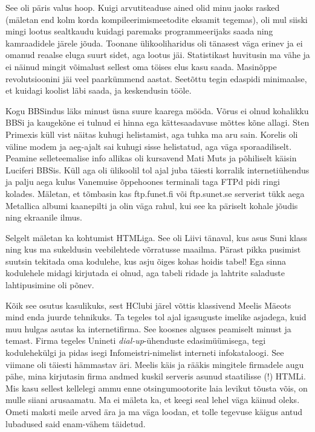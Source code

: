 See oli päris 
valus hoop. Kuigi arvutiteaduse ained olid minu jaoks rasked (mäletan end kolm 
korda kompileerimismeetodite eksamit tegemas), oli mul siiski mingi lootus 
sealtkaudu kuidagi paremaks programmeerijaks saada ning kamraadidele järele 
jõuda. Toonane ülikooliharidus oli tänasest väga erinev ja ei omanud reaalse eluga 
suurt sidet, aga lootus jäi. Statistikast huvitusin ma vähe ja 
ei näinud mingit võimalust sellest oma töises elus kasu saada. Masinõppe revolutsioonini 
jäi veel paarkümmend aastat. Seetõttu tegin 
edaspidi minimaalse, et kuidagi koolist läbi saada, ja keskendusin tööle. 

Kogu BBSindus läks minust üsna suure kaarega mööda. Võrus ei olnud kohalikku 
BBSi ja kaugekõne ei tulnud ei hinna ega kättesaadavuse mõttes kõne allagi. 
Sten Primexis küll vist näitas kuhugi 
helistamist, aga tuhka ma aru sain. Korelis oli väline modem ja aeg-ajalt 
sai kuhugi sisse helistatud, aga väga sporaadiliselt. Peamine 
selleteemalise info allikas oli kursavend Mati Muts ja 
põhiliselt käisin Luciferi \mbox{BBSis}. Küll aga oli 
ülikoolil tol ajal juba täiesti korralik internetiühendus ja palju aega kulus 
Vanemuise õppehoones terminali 
taga FTPd pidi ringi kolades. Mäletan, et tõmbasin kas ftp.funet.fi või 
ftp.sunet.se serverist tükk aega Metallica albumi kaanepilti ja olin väga 
rahul, kui see ka päriselt kohale jõudis ning ekraanile ilmus.

Selgelt mäletan ka kohtumist HTMLiga. See oli Liivi 
tänaval, kus asus Suni 
klass 
ning kus ma sukeldusin veebilehtede 
võrratusse maailma. Pärast pikka pusimist suutsin tekitada oma kodulehe, kus 
asju õiges kohas hoidis tabel! Ega sinna kodulehele midagi kirjutada ei olnud, 
aga tabeli ridade ja lahtrite saladuste lahtipusimine oli põnev.

Kõik see osutus kasulikuks, sest HClubi järel võttis 
klassivend Meelis Mäeots mind enda juurde tehnikuks. Ta tegeles tol ajal 
igasuguste imelike asjadega, kuid muu hulgas asutas ka internetifirma. See koosnes 
alguses peamiselt minust ja temast. Firma tegeles Unineti 
\emph{dial-up}-ühenduste edasimüümisega, tegi kodulehekülgi ja pidas isegi 
Infomeistri-nimelist interneti infokataloogi. See viimane oli täiesti hämmastav 
äri. Meelis käis ja rääkis mingitele firmadele augu pähe, mina kirjutasin firma 
andmed kuskil serveris asunud staatilisse (!) HTMLi. Mis kasu sellest kellelegi 
ammu enne otsingumootorite laia levikut tõusta võis, on mulle siiani 
arusaamatu. Ma ei mäleta ka, et keegi seal lehel väga käinud oleks. Ometi maksti 
meile arved ära ja ma väga loodan, et tolle tegevuse käigus antud lubadused said
enam-vähem täidetud. 

